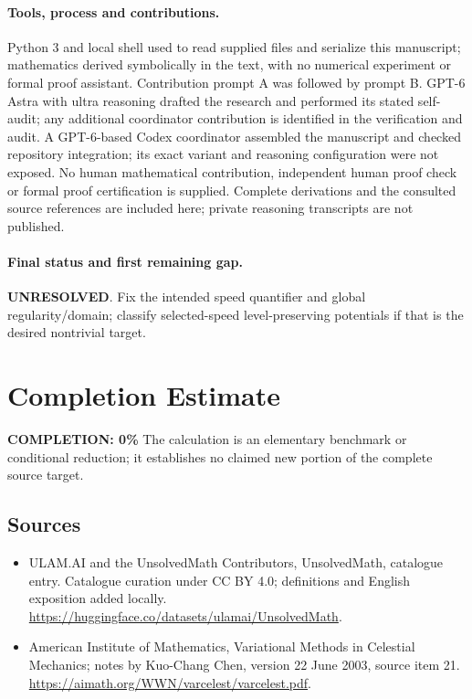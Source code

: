 \documentclass[11pt]{article}
\begin{document}
\paragraph{Tools, process and contributions.}
Python 3 and local shell used to read supplied files and serialize this manuscript; mathematics derived symbolically in the text, with no numerical experiment or formal proof assistant. Contribution prompt A was followed by prompt B. GPT-6 Astra with ultra reasoning drafted the research and performed its stated self-audit; any additional coordinator contribution is identified in the verification and audit. A GPT-6-based Codex coordinator assembled the manuscript and checked repository integration; its exact variant and reasoning configuration were not exposed. No human mathematical contribution, independent human proof check or formal proof certification is supplied. Complete derivations and the consulted source references are included here; private reasoning transcripts are not published.

\paragraph{Final status and first remaining gap.}
\textbf{UNRESOLVED}. Fix the intended speed quantifier and global regularity/domain; classify selected-speed level-preserving potentials if that is the desired nontrivial target.

\section{Completion Estimate}
\noindent\textbf{COMPLETION: 0\%}
The calculation is an elementary benchmark or conditional reduction; it establishes no claimed new portion of the complete source target.

\subsection{Sources}
\begin{itemize}
\item[\hypertarget{source:statement:1}{S1}] ULAM.AI and the UnsolvedMath Contributors, UnsolvedMath, catalogue entry. Catalogue curation under CC BY 4.0; definitions and English exposition added locally.
\url{https://huggingface.co/datasets/ulamai/UnsolvedMath}.
\item[\hypertarget{source:statement:2}{S2}] American Institute of Mathematics, Variational Methods in Celestial Mechanics; notes by Kuo-Chang Chen, version 22 June 2003, source item 21.
\url{https://aimath.org/WWN/varcelest/varcelest.pdf}.
\end{itemize}
\label{end:statement}
\end{document}
